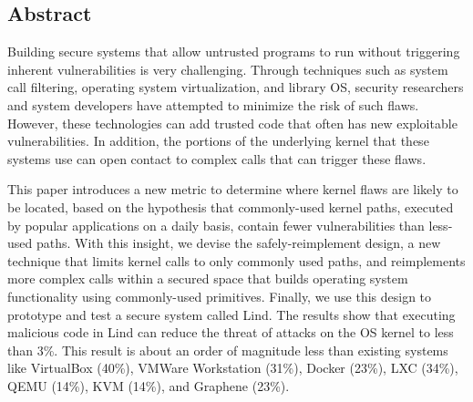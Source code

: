 \subsection*{Abstract}
Building secure systems that allow untrusted programs to run without
triggering inherent vulnerabilities %
is very challenging.
Through techniques such as system call filtering,
operating system virtualization, and library OS, security researchers
and system developers have attempted to minimize the risk of such flaws.
However, these technologies can add trusted code that often has new
exploitable vulnerabilities. In addition, the portions of the underlying kernel
that these systems use can open contact to complex calls that can trigger these
flaws.

This paper introduces a new metric to determine where kernel flaws are
likely to be located, based on the  hypothesis that commonly-used kernel
paths, executed by popular applications on a daily basis, contain fewer
vulnerabilities than less-used paths. With this insight, we devise the
safely-reimplement design, a new technique that limits kernel calls to only
commonly used paths, and reimplements more complex calls within a secured space
that builds operating system functionality
using commonly-used primitives.
Finally, we use this design to prototype and test a secure system called Lind.
The results show that executing malicious code in Lind can reduce the threat
of attacks on the OS kernel to less than 3\%.
This result is about an order of magnitude less than existing systems like VirtualBox (40\%),
VMWare Workstation (31\%), Docker (23\%), LXC (34\%), QEMU (14\%), KVM (14\%), and Graphene (23\%).



